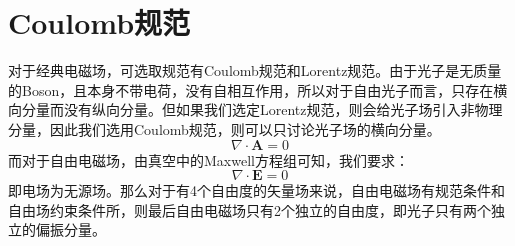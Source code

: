 \section{Coulomb规范}
\par 对于经典电磁场，可选取规范有Coulomb规范和Lorentz规范。由于光子是无质量的Boson，且本身不带电荷，没有自相互作用，所以对于自由光子而言，只存在横向分量而没有纵向分量。但如果我们选定Lorentz规范，则会给光子场引入非物理分量，因此我们选用Coulomb规范，则可以只讨论光子场的横向分量。
\begin{equation}
\nabla\cdot\boldsymbol{A}=0
\end{equation}
而对于自由电磁场，由真空中的Maxwell方程组可知，我们要求：
\begin{equation}
\nabla\cdot\boldsymbol{E}=0
\end{equation}
即电场为无源场。那么对于有4个自由度的矢量场来说，自由电磁场有规范条件和自由场约束条件所，则最后自由电磁场只有2个独立的自由度，即光子只有两个独立的偏振分量。

